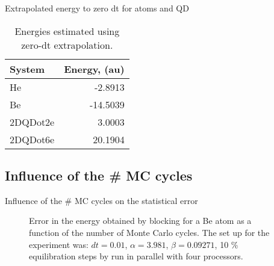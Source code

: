 \begin{frame}{Extrapolated energy to zero dt for atoms and QD}
  \begin{scriptsize}
  \begin{table}
  \centering
  \begin{tabular}{lr}
    \toprule[1pt]
    \textbf{System} & \textbf{Energy}, (au)\\
    \midrule[1pt]
    He &  -2.8913\\
    Be &  -14.5039\\
    2DQDot2e & 3.0003\\
    2DQDot6e & 20.1904\\
    \bottomrule[1pt]
  \end{tabular}\caption{Energies estimated using zero-dt extrapolation.%
  }\label{energyCuts}
  \end{table}
  \end{scriptsize}
\end{frame}



\subsection{Influence of the \# MC cycles}
\begin{frame}{Influence of the \# MC cycles on the statistical error}
  \begin{scriptsize}
  \begin{figure}[!hbt]
    \begin{center}
      \caption{Error in the energy obtained by blocking for a Be atom as a function of the number of Monte Carlo cycles. The set up for the experiment was: $dt = 0.01$, $\alpha = 3.981$, $\beta = 0.09271$, 10 \% equilibration steps by run in parallel with four processors.}
      \label{errorVsMcBe}
    \end{center}
  \end{figure}
  \end{scriptsize}
\end{frame}










